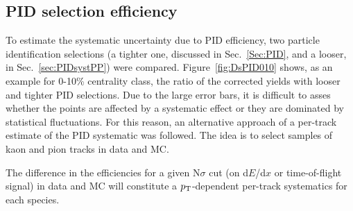 \subsection{PID selection efficiency}
\label{sec:PIDsystAA}
To estimate the systematic uncertainty due to PID efficiency,
two particle identification selections (a tighter one, discussed in Sec.~\ref{Sec:PID}, and a 
looser, in Sec.~\ref{sec:PIDsystPP}) were compared. Figure~\ref{fig:DsPID010} 
shows, as an example for 0-10\% centrality class, the ratio of the corrected yields 
with looser and tighter PID selections. Due to the large error bars, it is difficult to asses
whether the points are affected by a systematic effect
or they are dominated by statistical fluctuations.
For this reason, an alternative approach of a per-track estimate of the PID
systematic was followed. The idea is to select samples of kaon and pion tracks in data and
MC. 

The difference in the efficiencies for a given N$\sigma$ cut (on d$E$/d$x$ or 
time-of-flight signal) in data and MC will
constitute a $p_{\rm T}$-dependent per-track systematics for each species.

